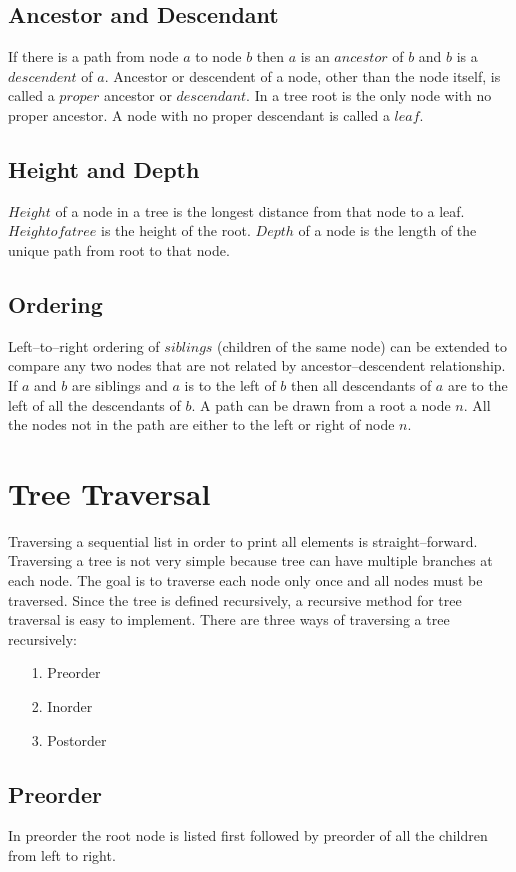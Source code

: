 \documentclass[12pt,a4paper]{article}
\begin{document}
\subsection{Ancestor and Descendant}
If there is a path from node $a$ to node $b$ then $a$ is an $ancestor$ of $b$ and $b$ is a $descendent$ of $a$. Ancestor or descendent of a node, other than the node itself, is called a $proper$ ancestor or $descendant$. In a tree root is the only node with no proper ancestor. A node with no proper descendant is called a $leaf$.
\subsection{Height and Depth}
$Height$ of a node in a tree is the longest distance from that node to a leaf. $Height of a tree$ is the height of the root. $Depth$ of a node is the length of the unique path from root to that node.
\subsection{Ordering}
Left--to--right ordering of $siblings$ (children of the same node) can be extended to compare any two nodes that are not related by ancestor--descendent relationship. If $a$ and $b$ are siblings and $a$ is to the left of $b$ then all descendants of $a$ are to the left of all the descendants of $b$. A path can be drawn from a root a node $n$. All the nodes not in the path are either to the left or right of node $n$.
\section{Tree Traversal}
Traversing a sequential list in order to print all elements is straight--forward. Traversing a tree is not very simple because tree can have multiple branches at each node. The goal is to traverse each node only once and all nodes must be traversed. Since the tree is defined recursively, a recursive method for tree traversal is easy to implement. There are three ways of traversing a tree recursively:
\begin{itemize}
\item[1.] Preorder
\item[2.] Inorder
\item[3.] Postorder
\end{itemize}
\subsection{Preorder}
In preorder the root node is listed first followed by preorder of all the children from left to right.
\end{document}
